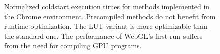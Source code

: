 \begin{figure}

    \label{plot:coldstart-chrome}
    \caption{Normalized coldstart execution times for methods implemented in the Chrome environment. Precompiled methods do not benefit from runtime optimization. The LUT variant is more optimizable than the standard one. The performance of WebGL's first run suffers from the need for compiling GPU programs.}
\end{figure}
